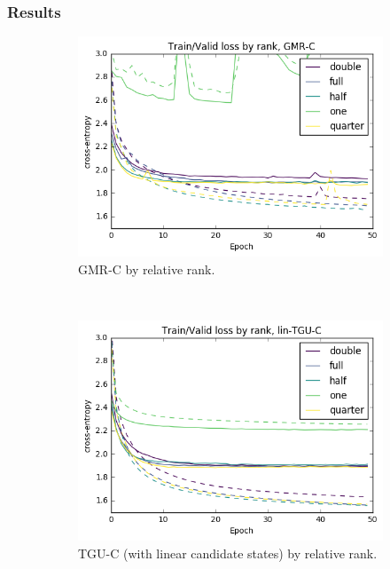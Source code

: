 \subsubsection{Results}
\begin{figure}[t]
\centering
\begin{subfigure}[t]{0.3\textwidth}
	\centering
	\includegraphics[width=\textwidth]{exps/wp/gmr}
	\caption[War and Peace, GMR]
	{GMR-C by relative rank.}
\end{subfigure}~
\begin{subfigure}[t]{0.3\textwidth}
	\centering
	\includegraphics[width=\textwidth]{exps/wp/lintgu}
	\caption[War and Peace, TGU]
	{TGU-C (with linear candidate states) by relative rank.}
\end{subfigure}~
\begin{subfigure}[t]{0.3\textwidth}

\end{subfigure}
\end{figure}
